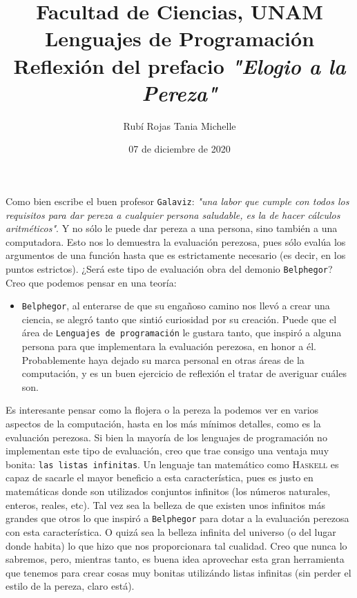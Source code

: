 \documentclass[letterpaper,11pt]{article}
\title{Facultad de Ciencias, UNAM \\ 
       Lenguajes de Programación\\ 
       Reflexión del prefacio \textit{"Elogio a la Pereza"}}
\author{Rubí Rojas Tania Michelle}
\date{07 de diciembre de 2020}
\begin{document}
\maketitle

Como bien escribe el buen profesor \texttt{Galaviz}: \textit{"\;una labor que 
cumple con todos los requisitos para dar pereza a cualquier persona saludable, 
es la de hacer cálculos aritméticos"}. Y no sólo le puede dar pereza a una 
persona, sino también a una computadora. Esto nos lo demuestra la evaluación 
perezosa, pues sólo evalúa los argumentos de una función hasta que es 
estrictamente necesario (es decir, en los puntos estrictos). ¿Será este tipo 
de evaluación obra del demonio \texttt{Belphegor}? Creo que podemos pensar 
en una teoría:
\begin{itemize}
    \item \texttt{Belphegor}, al enterarse de que su engañoso camino nos llevó 
    a crear una ciencia, se alegró tanto que sintió curiosidad por su creación.
    Puede que el área de \texttt{Lenguajes de programación} le gustara tanto, 
    que inspiró a alguna persona para que implementara la evaluación perezosa, 
    en honor a él. Probablemente haya dejado su marca personal en otras áreas 
    de la computación, y es un buen ejercicio de reflexión el tratar de 
    averiguar cuáles son.
\end{itemize}

Es interesante pensar como la flojera o la pereza la podemos ver en varios 
aspectos de la computación, hasta en los más mínimos detalles, como es la 
evaluación perezosa. Si bien la mayoría de los lenguajes de programación no 
implementan este tipo de evaluación, creo que trae consigo una ventaja muy 
bonita: \texttt{las listas infinitas}. Un lenguaje tan matemático como 
\textsc{Haskell} es capaz de sacarle el mayor beneficio a esta característica, 
pues es justo en matemáticas donde son utilizados conjuntos infinitos (los 
números naturales, enteros, reales, etc). Tal vez sea la belleza de que existen 
unos infinitos más grandes que otros lo que inspiró a \texttt{Belphegor} para 
dotar a la evaluación perezosa con esta característica. O quizá sea la belleza 
infinita del universo (o del lugar donde habita) lo que hizo que nos 
proporcionara tal cualidad. Creo que nunca lo sabremos, pero, mientras tanto, 
es buena idea aprovechar esta gran herramienta que tenemos para crear cosas 
muy bonitas utilizándo listas infinitas (sin perder el estilo de la pereza, 
claro está).
\end{document}

